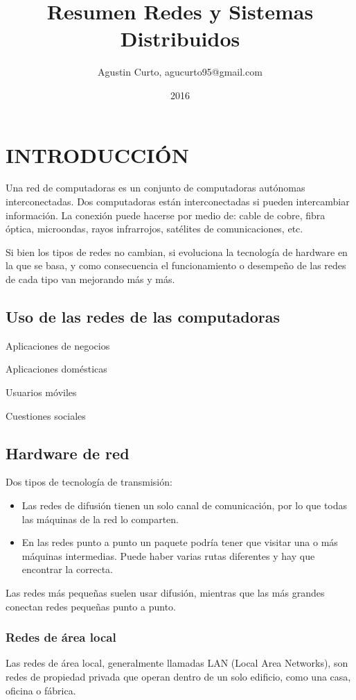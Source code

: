 \documentclass[10pt,a4paper]{report}
\author{Agustin Curto, agucurto95@gmail.com}
\title{Resumen Redes y Sistemas Distribuidos}
\date{2016}
\begin{document}
\maketitle
\tableofcontents

\chapter{INTRODUCCIÓN}
\par Una red de computadoras es un conjunto de computadoras autónomas 
interconectadas. Dos computadoras están interconectadas si pueden intercambiar 
información. La conexión puede hacerse por medio de: cable de cobre, fibra óptica, 
microondas, rayos infrarrojos, satélites de comunicaciones, etc.
\par Si bien los tipos de redes no cambian, si evoluciona la tecnología de hardware en 
la que se basa, y como consecuencia el funcionamiento o desempeño de las redes de 
cada tipo van mejorando más y más.

\section{Uso de las redes de las computadoras}
\par Aplicaciones de negocios
\par Aplicaciones domésticas
\par Usuarios móviles
\par Cuestiones sociales

\section{Hardware de red}
\par Dos tipos de tecnología de transmisión:
	\begin{itemize}
		\item Las redes de difusión tienen un solo canal de comunicación, por lo que 
		todas las máquinas de la red lo comparten.
		\item En las redes punto a punto un paquete podría tener que visitar una o más 
		máquinas intermedias. Puede haber varias rutas diferentes y hay que encontrar la 
		correcta.
	\end{itemize}
\par Las redes más pequeñas suelen usar difusión, mientras que las más grandes 
conectan redes pequeñas punto a punto.

\subsection{Redes de área local}
\par Las redes de área local, generalmente llamadas LAN (Local Area Networks), son 
redes de propiedad privada que operan dentro de un solo edificio, como una casa, 
oficina o fábrica.
\end{document}
